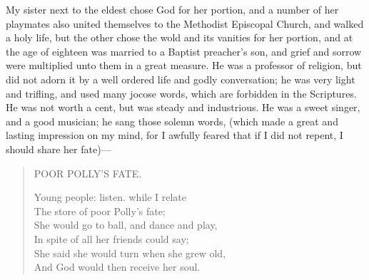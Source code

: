 \documentclass{article}
\renewcommand\footnote[1]{} %
\begin{document}
My sister next to the eldest\footnote{Maria} chose God for her portion, and a number of her playmates also united themselves to the Methodist Episcopal Church, and walked a holy life, but the other\footnote{Harriet} chose the wold and its vanities for her portion, and at the age of eighteen\footnote{in the year 1814} was married to a Baptist preacher's son\footnote{Joseph Perkins}, and grief and sorrow were multiplied unto them in a great measure.
He was a professor of religion, but did not adorn it by a well ordered life and godly conversation; he was very light and trifling, and used many jocose words, which are forbidden in the Scriptures.
He was not worth a cent, but was steady and industrious.
He was a sweet singer, and a good musician; he sang those solemn words, (which made a great and lasting impression on my mind, for I awfully feared that if I did not repent, I should share her fate)---
\begin{quote}
    \begin{center}
        POOR POLLY'S FATE.
    \end{center}
    Young people: listen. while I relate\\
    The store of poor Polly's fate;\\
    She would go to ball, and dance and play,\\
    In spite of all her friends could say;\\
    She said she would turn when she grew old,\\
    And God would then receive her soul.\\
\end{quote}
\end{document}

